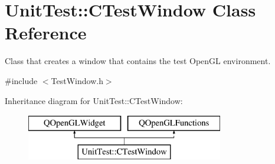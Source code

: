 \hypertarget{class_unit_test_1_1_c_test_window}{}\section{Unit\+Test\+::C\+Test\+Window Class Reference}
\label{class_unit_test_1_1_c_test_window}


Class that creates a window that contains the test Open\+GL environment.  




{\ttfamily \#include $<$Test\+Window.\+h$>$}

Inheritance diagram for Unit\+Test\+::C\+Test\+Window\+:\begin{figure}[H]
\begin{center}
\leavevmode
\includegraphics[height=2.000000cm]{class_unit_test_1_1_c_test_window}
\end{center}
\end{figure}
